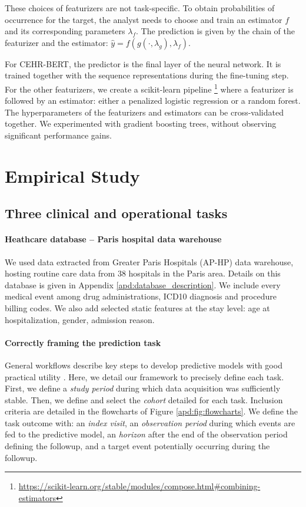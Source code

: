 \documentclass[french,12pt,twoside,a4paper]{book}
\begin{document}
These choices of featurizers are not task-specific. To obtain probabilities of
occurrence for the target, the analyst needs to choose and train an estimator $f$
and its corresponding parameters $\lambda_f$. The prediction is given by the chain of the featurizer and the
estimator: $\hat{y} = f(g(\cdot, \lambda_g), \lambda_f)$.

For CEHR-BERT, the predictor is the final layer of the neural network. It is
trained together with the sequence representations during the fine-tuning step.
For the other featurizers, we create a scikit-learn pipeline
\footnote{\url{https://scikit-learn.org/stable/modules/compose.html\#combining-estimators}}
where a featurizer is followed by an estimator: either a penalized logistic
regression or a random forest. The hyperparameters of the featurizers and
estimators can be cross-validated together. %
We experimented with gradient boosting trees, without observing significant performance gains.


\section{Empirical Study}\label{sec:predictive_models:empirical_study}

\subsection{Three clinical and operational tasks}%
\label{subsec:predictive_models:task_definitions}%

\paragraph{Heathcare database -- Paris hospital data warehouse}%
\label{sec:data_extraction}%

We used data extracted from Greater Paris Hospitals (AP-HP) data
warehouse, hosting routine care data from 38 hospitals in the Paris area.
Details on this database is given in Appendix \ref{apd:database_description}. We
include every medical event among drug administrations, ICD10 diagnosis and
procedure billing codes. We also add selected static features at the stay level:
age at hospitalization, gender, admission reason.

\paragraph{Correctly framing the prediction task} General workflows describe key
steps to develop predictive models with good practical utility
\citep{ohdsi2019book,tomavsev2021use,jiang2023health}. Here, we detail our
framework to precisely define each task. First, we define a \emph{study period}
during which data acquisition was sufficiently stable. Then, we define and
select the \emph{cohort} detailed for each task. Inclusion criteria are detailed
in the flowcharts of Figure \ref{apd:fig:flowcharts}. We define
the task outcome with: an \emph{index visit}, an \emph{observation period}
during which events are fed to the predictive model, an \emph{horizon} after the
end of the observation period defining the followup, and a target event potentially occurring
during the followup.
\end{document}
